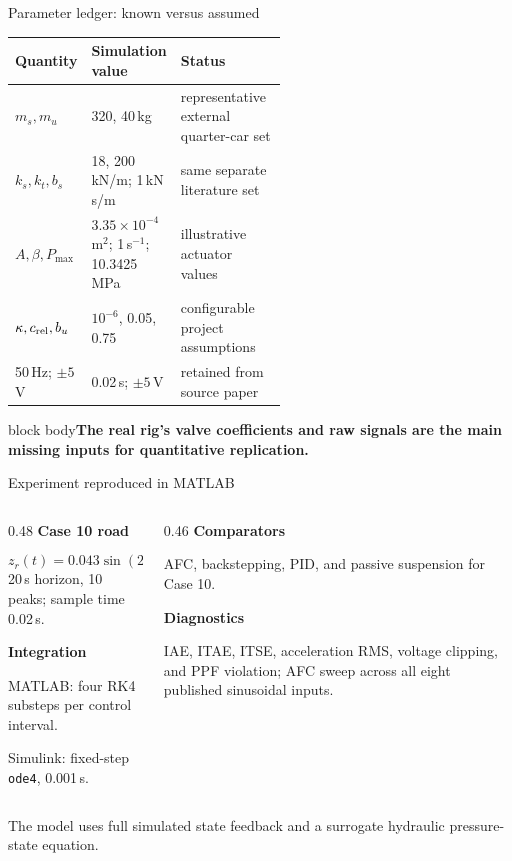 \documentclass[aspectratio=169,10pt]{beamer}
\newcommand{\source}[1]{\vfill{\color{muted}\scriptsize #1}}
\newcommand{\takeaway}[1]{\vfill\begin{beamercolorbox}[wd=\linewidth,sep=1ex]{block body}\color{accent}\bfseries #1\end{beamercolorbox}}
\begin{document}
\begin{frame}{Parameter ledger: known versus assumed}
\vspace{0.25cm}
\begin{tabularx}{\linewidth}{@{}p{0.28\linewidth}p{0.26\linewidth}X@{}}
\toprule
Quantity & Simulation value & Status\\
\midrule
\(m_s,m_u\) & 320, 40\,kg & representative external quarter-car set\\
\(k_s,k_t,b_s\) & 18, 200\,kN/m; 1\,kN\,s/m & same separate literature set\\
\(A,\beta,P_{\max}\) & \(3.35\times10^{-4}\)\,m\(^2\); 1\,s\(^{-1}\); 10.3425\,MPa & illustrative actuator values\\
\(\kappa,c_{\rm rel},b_u\) & \(10^{-6}\), 0.05, 0.75 & configurable project assumptions\\
50\,Hz; \(\pm5\)\,V & 0.02\,s; \(\pm5\)\,V & retained from source paper\\
\bottomrule
\end{tabularx}
\takeaway{The real rig's valve coefficients and raw signals are the main missing inputs for quantitative replication.}
\end{frame}

\begin{frame}{Experiment reproduced in MATLAB}
\begin{columns}[T,totalwidth=\linewidth]
\begin{column}{0.48\linewidth}
{\color{accent}\large\bfseries Case 10 road}\par
\[z_r(t)=0.043\sin(2\pi\cdot0.505t)\ \mathrm{m}\]
20\,s horizon, 10 peaks; sample time 0.02\,s.
\vspace{0.5cm}

{\color{accent}\large\bfseries Integration}\par
MATLAB: four RK4 substeps per control interval.\par
Simulink: fixed-step \texttt{ode4}, 0.001\,s.
\end{column}
\begin{column}{0.46\linewidth}
{\color{warm}\large\bfseries Comparators}\par
AFC, backstepping, PID, and passive suspension for Case 10.
\vspace{0.5cm}

{\color{warm}\large\bfseries Diagnostics}\par
IAE, ITAE, ITSE, acceleration RMS, voltage clipping, and PPF violation; AFC sweep across all eight published sinusoidal inputs.
\end{column}
\end{columns}
\source{The model uses full simulated state feedback and a surrogate hydraulic pressure-state equation.}
\end{frame}
\end{document}
